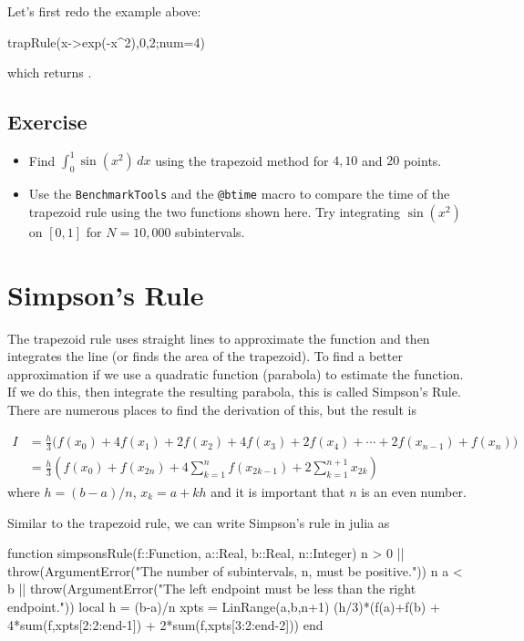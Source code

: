 Let's first redo the example above: 
\begin{jlblock}[numint]
trapRule(x->exp(-x^2),0,2;num=4)
\end{jlblock}
which returns  \printpythontex[verb].

\subsection{Exercise}
\begin{itemize}
\item Find $\int_0^{1} \sin(x^2)\,dx$ using the trapezoid method for $4, 10$ and $20$ points.  
\item Use the \texttt{BenchmarkTools} and the \texttt{@btime} macro to compare the time of the trapezoid rule using the two functions shown here. Try integrating $\sin(x^2)$ on $[0,1]$ for $N=10,000$ subintervals. 
\end{itemize}


\section{Simpson's Rule}

The trapezoid rule uses straight lines to approximate the function and then integrates the line (or finds the area of the trapezoid).  To find a better approximation if we use a quadratic function (parabola) to estimate the function.  If we do this, then integrate the resulting parabola, this is called Simpson's Rule.  There are numerous places to find the derivation of this, but the result is 

\begin{align*}
I & = \frac{h}{3} \bigl( f(x_0) + 4 f(x_1) + 2 f(x_2) + 4 f(x_3) + 2 f(x_4) + \cdots + 2 f(x_{n-1}) + f(x_n) \bigr) \\
& = \frac{h}{3} \left(f(x_0)+ f(x_{2n}) + 4 \sum_{k=1}^{n} f(x_{2k-1}) + 2\sum_{k=1}^{n+1} x_{2k} \right) 
\end{align*}
where $h=(b-a)/n$, $x_k = a + kh$ and it is important that $n$ is an even number. 

Similar to the trapezoid rule, we can write Simpson's rule in julia as 

\begin{jlblock}[numint]
function simpsonsRule(f::Function, a::Real, b::Real, n::Integer) 
  n > 0 || throw(ArgumentError("The number of subintervals, n, must be positive."))
  n %
  a < b || throw(ArgumentError("The left endpoint must be less than the right endpoint."))
  local h = (b-a)/n
  xpts = LinRange(a,b,n+1)
  (h/3)*(f(a)+f(b) + 4*sum(f,xpts[2:2:end-1]) + 2*sum(f,xpts[3:2:end-2]))
end
\end{jlblock}

